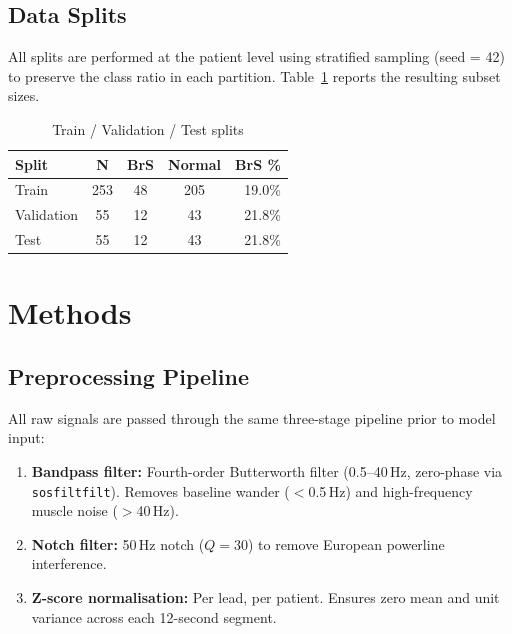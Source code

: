 \documentclass[journal, 10pt, twoside]{IEEEtran}
\begin{document}
\subsection{Data Splits}

All splits are performed at the patient level using stratified sampling
(seed = 42) to preserve the class ratio in each partition.
Table~\ref{tab:splits} reports the resulting subset sizes.

\begin{table}[h]
  \centering
  \caption{Train / Validation / Test splits}
  \label{tab:splits}
  \begin{tabular}{lcccr}
    \toprule
    \textbf{Split} & \textbf{N} & \textbf{BrS} & \textbf{Normal} & \textbf{BrS \%} \\
    \midrule
    Train      & 253 & 48 & 205 & 19.0\% \\
    Validation & 55  & 12 & 43  & 21.8\% \\
    Test       & 55  & 12 & 43  & 21.8\% \\
    \bottomrule
  \end{tabular}
\end{table}

\section{Methods}
\label{sec:methods}

\subsection{Preprocessing Pipeline}

All raw signals are passed through the same three-stage pipeline
prior to model input:

\begin{enumerate}
  \item \textbf{Bandpass filter:} Fourth-order Butterworth filter
        (0.5--40\,Hz, zero-phase via \texttt{sosfiltfilt}).
        Removes baseline wander ($<$0.5\,Hz) and high-frequency
        muscle noise ($>$40\,Hz).
  \item \textbf{Notch filter:} 50\,Hz notch ($Q = 30$) to remove
        European powerline interference.
  \item \textbf{Z-score normalisation:} Per lead, per patient.
        Ensures zero mean and unit variance across each 12-second segment.
\end{enumerate}
\end{document}

